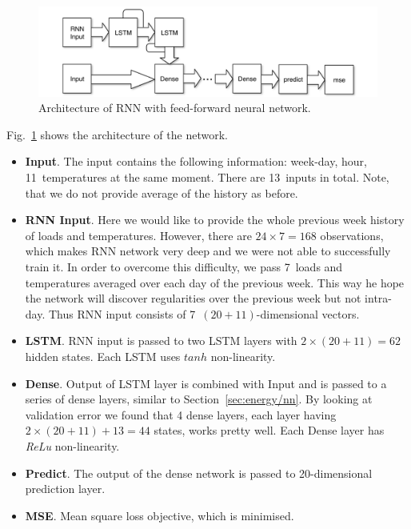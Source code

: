 \documentclass{article} %
\begin{document}
\begin{figure}[h]
\begin{center}
\includegraphics[width=0.70\linewidth]{energy_RNN_diag.pdf}	
\end{center}
\caption{Architecture of RNN with feed-forward neural network.}
\label{fig:energy/rnn_diag}
\end{figure}
Fig.~\ref{fig:energy/rnn_diag} shows the architecture of the network.
\begin{itemize}
	\item {\bf Input}.
	The input contains the following information: week-day, hour, 11~temperatures
	at the same moment. There are 13~inputs in total. Note, that we do not provide
	average of the history as before.
	\item {\bf RNN Input}.
	Here we would like to provide the whole previous week history of 
	loads and temperatures. However, there are $24\times7=168$ observations,
	which makes RNN network very deep and we were not able to successfully
	train it. In order to overcome this difficulty, we pass 7~loads and 
	temperatures averaged over each day of the previous week. 
	This way he hope the network will discover regularities over the previous
	week but not intra-day.
	Thus 
	RNN input consists of
	7~$(20+11)$-dimensional vectors.
	\item {\bf LSTM}. RNN input is passed to two LSTM layers with 
	$2\times(20+11)=62$ hidden states. Each LSTM uses $tanh$ non-linearity.
	\item {\bf Dense}. 
	Output of LSTM layer is combined with Input and is passed to a series of dense
	layers, similar to Section~\ref{sec:energy/nn}. 
	By looking at validation error we found that 4 dense layers,
	each layer having $2\times(20+11)+13=44$ states,
	works pretty well. Each Dense layer has {\it ReLu} non-linearity.
	\item {\bf Predict}.
	The output of the dense network is passed to 20-dimensional 
	prediction layer.
	\item {\bf MSE}.
	Mean square loss objective, which is minimised. 
\end{itemize}
\end{document}
